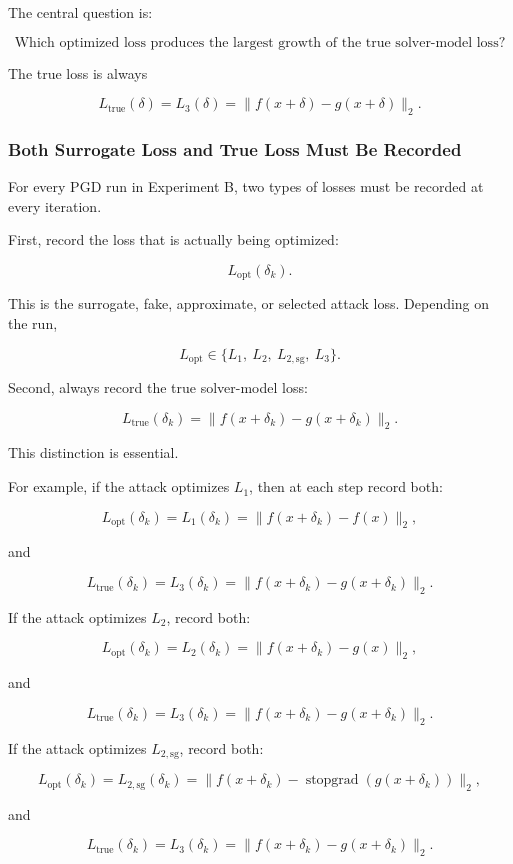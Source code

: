 \documentclass{article}
\begin{document}
The central question is:

\[
\text{Which optimized loss produces the largest growth of the true solver-model loss?}
\]

The true loss is always

\[
L_{\mathrm{true}}(\delta)
=
L_3(\delta)
=
\|f(x+\delta)-g(x+\delta)\|_2.
\]

\subsubsection{Both Surrogate Loss and True Loss Must Be Recorded}

For every PGD run in Experiment B, two types of losses must be recorded at every iteration.

First, record the loss that is actually being optimized:

\[
L_{\mathrm{opt}}(\delta_k).
\]

This is the surrogate, fake, approximate, or selected attack loss. Depending on the run,

\[
L_{\mathrm{opt}}
\in
\{L_1,\ L_2,\ L_{2,\mathrm{sg}},\ L_3\}.
\]

Second, always record the true solver-model loss:

\[
L_{\mathrm{true}}(\delta_k)
=
\|f(x+\delta_k)-g(x+\delta_k)\|_2.
\]

This distinction is essential.

For example, if the attack optimizes \(L_1\), then at each step record both:

\[
L_{\mathrm{opt}}(\delta_k)
=
L_1(\delta_k)
=
\|f(x+\delta_k)-f(x)\|_2,
\]

and

\[
L_{\mathrm{true}}(\delta_k)
=
L_3(\delta_k)
=
\|f(x+\delta_k)-g(x+\delta_k)\|_2.
\]

If the attack optimizes \(L_2\), record both:

\[
L_{\mathrm{opt}}(\delta_k)
=
L_2(\delta_k)
=
\|f(x+\delta_k)-g(x)\|_2,
\]

and

\[
L_{\mathrm{true}}(\delta_k)
=
L_3(\delta_k)
=
\|f(x+\delta_k)-g(x+\delta_k)\|_2.
\]

If the attack optimizes \(L_{2,\mathrm{sg}}\), record both:

\[
L_{\mathrm{opt}}(\delta_k)
=
L_{2,\mathrm{sg}}(\delta_k)
=
\|f(x+\delta_k)-\operatorname{stopgrad}(g(x+\delta_k))\|_2,
\]

and

\[
L_{\mathrm{true}}(\delta_k)
=
L_3(\delta_k)
=
\|f(x+\delta_k)-g(x+\delta_k)\|_2.
\]
\end{document}
